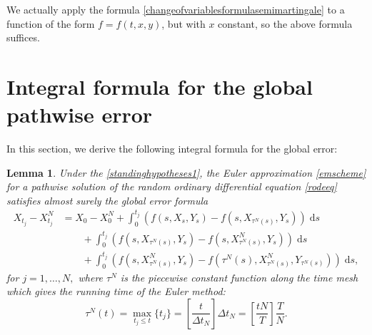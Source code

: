\documentclass[reqno,12pt]{amsart}
\theoremstyle{plain} %
\newtheorem{lemma}{Lemma}[section]
\theoremstyle{definition} %
\begin{document}
We actually apply the formula \cref{changeofvariablesformulasemimartingale} to a function of the form $f=f(t, x, y)$, but with $x$ constant, so the above formula suffices.

\section{Integral formula for the global pathwise error}

In this section, we derive the following integral formula for the global error:
\begin{lemma}
    \label{lemglobalerrorintegralformula}
    Under the \cref{standinghypotheses1}, the Euler approximation \cref{emscheme} for a pathwise solution of the random ordinary differential equation \cref{rodeeq} satisfies almost surely the global error formula
    \begin{equation}
        \label{globalerrorintegralformula}
        \begin{aligned}
            X_{t_j} - X_{t_j}^N & = X_0 - X_0^N + \int_0^{t_j} \left( f(s, X_s, Y_s) - f(s, X_{\tau^N(s)}, Y_s) \right)\;\mathrm{d}s  \\ 
            & \qquad + \int_{0}^{t_j} \left( f(s, X_{\tau^N(s)}, Y_s) - f(s, X_{\tau^N(s)}^N, Y_s) \right)\;\mathrm{d}s \\
            & \qquad + \int_0^{t_j} \left( f(s, X_{\tau^N(s)}^N, Y_s) - f(\tau^N(s), X_{\tau^N(s)}^N, Y_{\tau^N(s)}) \right)\;\mathrm{d}s,
        \end{aligned}
    \end{equation}
    for $j = 1, \ldots, N,$ where $\tau^N$ is the piecewise constant function along the time mesh which gives the running time of the Euler method:
    \begin{equation}
        \label{tauNt}
        \tau^N(t) = \max_{t_j \leq t}\{t_j\} = \left[\frac{t}{\Delta t_N}\right]\Delta t_N = \left[\frac{tN}{T}\right]\frac{T}{N}.
    \end{equation}
\end{lemma}
\end{document}
